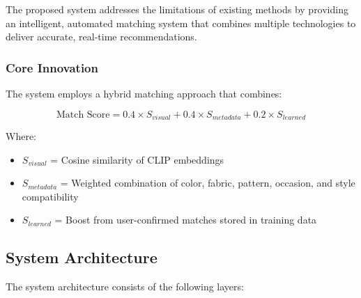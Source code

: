 \documentclass[12pt,a4paper]{report}
\begin{document}
The proposed system addresses the limitations of existing methods by providing an intelligent, automated matching system that combines multiple technologies to deliver accurate, real-time recommendations.

\subsubsection{Core Innovation}

The system employs a hybrid matching approach that combines:

\begin{equation}
\text{Match Score} = 0.4 \times S_{visual} + 0.4 \times S_{metadata} + 0.2 \times S_{learned}
\end{equation}

Where:
\begin{itemize}
    \item $S_{visual}$ = Cosine similarity of CLIP embeddings
    \item $S_{metadata}$ = Weighted combination of color, fabric, pattern, occasion, and style compatibility
    \item $S_{learned}$ = Boost from user-confirmed matches stored in training data
\end{itemize}

\subsection{System Architecture}


The system architecture consists of the following layers:
\end{document}
